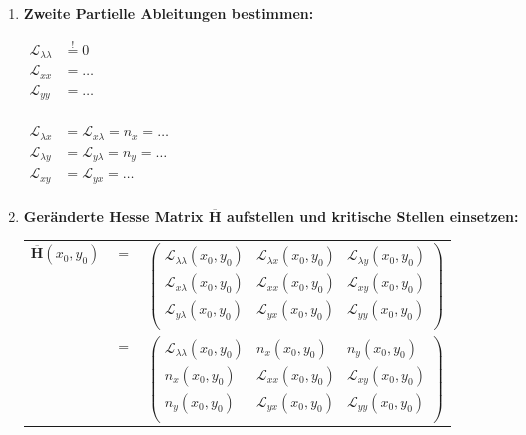 \begin{enumerate}[itemsep=1ex]
    \item \textbf{Zweite Partielle Ableitungen bestimmen:}\\
    \begin{minipage}[t]{0.4\columnwidth}
        $\begin{aligned}
            \mathcal{L}_{\lambda \lambda} &\stackrel{!}{=} 0\\
            \mathcal{L}_{xx} &= \dots\\
            \mathcal{L}_{yy} &= \dots\\
        \end{aligned}$
    \end{minipage}\hfill
    \begin{minipage}[c]{0.6\columnwidth}
        $\begin{aligned}
            \mathcal{L}_{\lambda x} &= \mathcal{L}_{x\lambda} = n_x = \dots\\
            \mathcal{L}_{\lambda y} &= \mathcal{L}_{y\lambda} = n_y =\dots\\
            \mathcal{L}_{xy} &= \mathcal{L}_{yx} = \dots\\
        \end{aligned}$
    \end{minipage}


    \item \textbf{Geränderte Hesse Matrix $\overline{\mathbf{H}}$ aufstellen und kritische Stellen einsetzen:}\\
    
    \begin{tabular}{lll}
        $\overline{\mathbf{H}}(x_0,y_0)$ &$=$&
        $\left(
            \begin{matrix}
                {{\mathcal{L}_{\lambda\lambda}(x_0, y_0)}}&{{\mathcal{L}_{\lambda x}(x_0, y_0)}}&{{\mathcal{L}_{\lambda y}(x_0, y_0)}}\\
                {{\mathcal{L}_{x\lambda}(x_0, y_0)}}&{{\mathcal{L}_{xx}(x_0, y_0)}}&{{\mathcal{L}_{xy}(x_0, y_0)}}\\
                {{\mathcal{L}_{y\lambda}(x_0, y_0)}}&{{\mathcal{L}_{yx}(x_0, y_0)}}&{{\mathcal{L}_{yy}(x_0, y_0)}}\\
            \end{matrix}
        \right)$\\
        &$=$&
        $\left(
            \begin{matrix}
                {{\mathcal{L}_{\lambda\lambda}(x_0, y_0)}}&{{n_{x}(x_0, y_0)}}&{{n_{y}(x_0, y_0)}}\\
                {{n_{x}(x_0, y_0)}}&{{\mathcal{L}_{xx}(x_0, y_0)}}&{{\mathcal{L}_{xy}(x_0, y_0)}}\\
                {{n_{y}(x_0, y_0)}}&{{\mathcal{L}_{yx}(x_0, y_0)}}&{{\mathcal{L}_{yy}(x_0, y_0)}}\\
            \end{matrix}
        \right)$
        

\end{tabular}
\end{enumerate}
